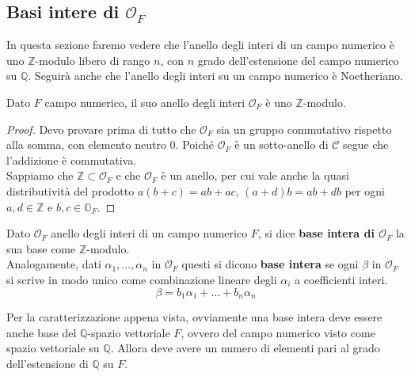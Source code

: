 \subsection{Basi intere di $\mathcal{O}_F$}
\label{lezione19}
In questa sezione faremo vedere che l'anello degli interi di un campo numerico è uno $\mathbb{Z}$-modulo libero di rango $n$, con $n$ grado dell'estensione del campo numerico su $\mathbb{Q}$. Seguirà anche che l'anello degli interi su un campo numerico è Noetheriano.
\begin{teorema}
	Dato $F$ campo numerico, il suo anello degli interi $\mathcal{O}_F$ è uno $\mathbb{Z}$-modulo.
\end{teorema}
\begin{proof}
	Devo provare prima di tutto che $\mathcal{O}_F$ sia un gruppo commutativo rispetto alla somma, con elemento neutro 0. 
	Poiché $\mathcal{O}_F$ è un sotto-anello di $\mathcal{C}$ segue che l'addizione è commutativa. \\
	Sappiamo che $\mathbb{Z} \subset \mathcal{O}_F$ e che $\mathcal{O}_F$ è un anello, 
	per cui vale anche la quasi distributività del prodotto 
	$a(b+c) = ab + ac$, $(a+d)b = ab + db$ per ogni 
	$a,d \in \mathbb{Z}$ e $b,c \in \mathbb{O}_F$.
\end{proof}
\begin{definizione}
	Dato $\mathcal{O}_F$ anello degli interi di un campo numerico $F$, si dice \textbf{base intera di $\mathcal{O}_F$} la sua base come $\mathbb{Z}$-modulo. \\ Analogamente, dati $\alpha_1,\dots,\alpha_n$ in $\mathcal{O}_F$ questi si dicono \textbf{base intera} se ogni $\beta$ in $\mathcal{O}_F$ si scrive in modo unico come combinazione lineare degli $\alpha_i$ a coefficienti interi.
	\begin{equation*}
	\beta=b_1\alpha_1+\dots+b_n\alpha_n
	\end{equation*}
\end{definizione}
\begin{osservazione}
	Per la caratterizzazione appena vista, ovviamente una base intera deve essere anche base del $\mathbb{Q}$-spazio vettoriale $F$, ovvero del campo numerico visto come spazio vettoriale su $\mathbb{Q}$. Allora deve avere un numero di elementi pari al grado dell'estensione di $\mathbb{Q}$ su $F$.
\end{osservazione}
